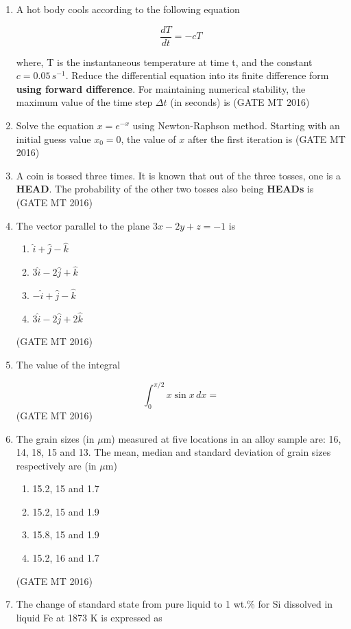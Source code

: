 \documentclass[journal, 11pt, onecolumn]{IEEEtran}
\theoremstyle{remark}
\begin{document}
\begin{enumerate}
\item A hot body cools according to the following equation

$$\frac{dT}{dt} = -cT$$

where, T is the instantaneous temperature at time t, and the constant $c = 0.05 \, s^{-1}$. Reduce the differential equation into its finite difference form \textbf{using forward difference}. For maintaining numerical stability, the maximum value of the time step $\Delta t$ (in seconds) is 
\hfill(GATE MT 2016)

\item Solve the equation $x = e^{-x}$ using Newton-Raphson method. Starting with an initial guess value $x_0 = 0$, the value of $x$ after the first iteration is 
\hfill(GATE MT 2016)

\item A coin is tossed three times. It is known that out of the three tosses, one is a \textbf{HEAD}. The probability of the other two tosses also being \textbf{HEADs} is 
\hfill(GATE MT 2016)

\item The vector parallel to the plane $3x - 2y + z = -1$ is
\begin{enumerate}
\item $\hat{i} + \hat{j} - \hat{k}$
\item $3\hat{i} - 2\hat{j} + \hat{k}$
\item $-\hat{i} + \hat{j} - \hat{k}$
\item $3\hat{i} - 2\hat{j} + 2\hat{k}$
\end{enumerate}
\hfill(GATE MT 2016)

\item The value of the integral

$$\int_{0}^{\pi/2} x \sin x \, dx =$$ 
\hfill(GATE MT 2016)

\item The grain sizes (in $\mu$m) measured at five locations in an alloy sample are: 16, 14, 18, 15 and 13. The mean, median and standard deviation of grain sizes respectively are (in $\mu$m)
\begin{enumerate}
\item 15.2, 15 and 1.7
\item 15.2, 15 and 1.9
\item 15.8, 15 and 1.9
\item 15.2, 16 and 1.7
\end{enumerate}
\hfill(GATE MT 2016)

\item The change of standard state from pure liquid to 1 wt.\% for Si dissolved in liquid Fe at 1873 K is expressed as


\end{enumerate}
\end{document}
